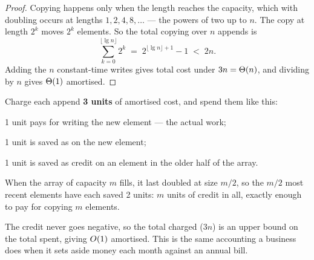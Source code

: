 \begin{proof}
Copying happens only when the length reaches the capacity, which with doubling
occurs at lengths $1, 2, 4, 8, \ldots$ --- the powers of two up to $n$. The
copy at length $2^{k}$ moves $2^{k}$ elements. So the total copying over $n$
appends is
\[ \sum_{k=0}^{\lfloor \lg n \rfloor} 2^{k} \;=\; 2^{\lfloor\lg n\rfloor+1}-1
   \;<\; 2n. \]
Adding the $n$ constant-time writes gives total cost under $3n = \Theta(n)$,
and dividing by $n$ gives $\Theta(1)$ amortised.
\end{proof}

\begin{conceptbox}
Charge each append \textbf{3 units} of amortised cost, and spend them like
this:

\begin{tight}
  \item 1 unit pays for writing the new element --- the actual work;
  \item 1 unit is saved as  on the new element;
  \item 1 unit is saved as credit on an element in the older half of the array.
\end{tight}

\smallskip
When the array of capacity $m$ fills, it last doubled at size $m/2$, so the
$m/2$ most recent elements have each saved 2 units: $m$ units of credit in all,
exactly enough to pay for copying $m$ elements.

\smallskip
The credit never goes negative, so the total charged ($3n$) is an upper bound
on the total spent, giving $O(1)$ amortised. This is the same accounting a
business does when it sets aside money each month against an annual bill.
\end{conceptbox}

